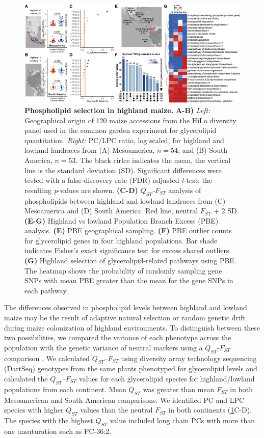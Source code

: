 \documentclass[9pt,twocolumn,twoside,lineno]{biorxiv}
\begin{document}
\begin{figure}[htp]
\centering
\includegraphics[width=0.8\paperwidth]{Figures/Fig_1.png}
\caption{\textbf{Phospholipid selection in highland maize.} 
\textbf{A-B)} \textit{Left:} Geographical origin of 120 maize accessions from the HiLo diversity panel used in the common garden experiment for glycerolipid quantitation.
\textit{Right:} PC/LPC ratio, log scaled, for highland and lowland landraces from (A) Mesoamerica, $n=54$; and (B) South America, $n=53$. The black cirlce indicates the mean, the vertical line is the standard deviation (SD). Significant differences were tested with a false-discovery rate (FDR) adjusted \textit{t}-test; the resulting \textit{p}-values are shown.
\textbf{(C-D)}
\textit{$Q_{ST}$-$F_{ST}$} analysis of phospholipids between highland and lowland landraces from (C) Mesoamerica  and (D) South America. 
Red line, neutral $F_{ST}$ + 2 SD.
\textbf{(E-G)} Highland vs lowland Population Branch Excess (PBE) analysis.
\textbf{(E)} PBE geographical sampling.
\textbf{(F)} PBE outlier counts for glycerolipid genes in four highland populations.
Bar shade indicates Fisher's exact significance test for excess shared outliers. 
\textbf{(G)} Highland selection of glycerolipid-related pathways using PBE. The heatmap shows the probability of randomly sampling gene SNPs with mean PBE greater than the mean for the gene SNPs in each pathway.}
\label{Fig1}
\end{figure}

The differences observed in phospholipid levels between highland and lowland maize may be the result of adaptive natural selection or random genetic drift during maize colonization of highland environments.
To distinguish between these two possibilities, we compared the variance of each phenotype across the population with the genetic variance of neutral markers using a $Q_{ST}$-$F_{ST}$ comparison \cite{Leinonen2013-ic}.
We calculated $Q_{ST}$--$F_{ST}$ using diversity array technology sequencing (DartSeq) genotypes \cite{Janzen2021-lz} from the same plants phenotyped for glycerolipid levels and calculated the $Q_{ST}$--$F_{ST}$ values for each glycerolipid species for highland/lowland populations from each continent. 
Mean $Q_{ST}$ was greater than mean $F_{ST}$ in both Mesoamerican and South American comparisons. 
We identified PC and LPC species with higher $Q_{ST}$ values than the neutral $F_{ST}$ in both continents  (\cref{Fig1}C-D).
The species with the highest $Q_{ST}$ value included long chain PCs with more than one unsaturation such as PC-36:2.
\end{document}
